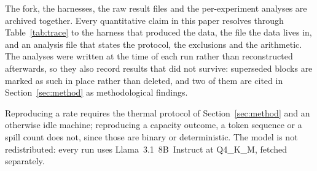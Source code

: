 \documentclass[manuscript,anonymous,review]{acmart}
\begin{document}
The fork, the harnesses, the raw result files and the per-experiment
analyses are archived together. Every quantitative claim in this paper
resolves through Table~\ref{tab:trace} to the harness that produced the
data, the file the data lives in, and an analysis file that states the
protocol, the exclusions and the arithmetic. The analyses were written
at the time of each run rather than reconstructed afterwards, so they
also record results that did not survive: superseded blocks are marked
as such in place rather than deleted, and two of them are cited in
Section~\ref{sec:method} as methodological findings.

Reproducing a rate requires the thermal protocol of
Section~\ref{sec:method} and an otherwise idle machine; reproducing a
capacity outcome, a token sequence or a spill count does not, since
those are binary or deterministic. The model is not redistributed:
every run uses Llama~3.1~8B~Instruct at Q4\_K\_M, fetched separately.
\end{document}
